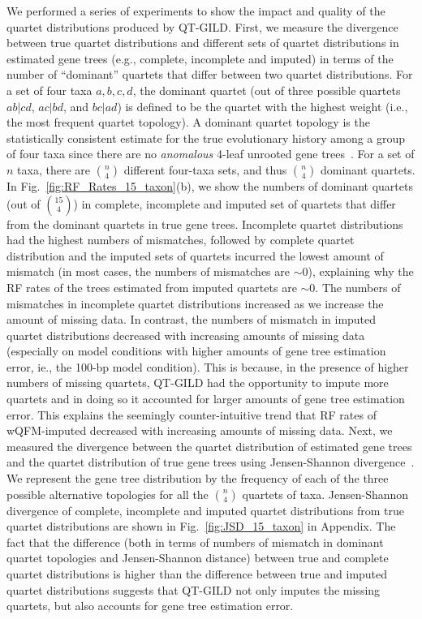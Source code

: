 We performed a series of experiments to show the impact and quality of the quartet distributions produced by QT-GILD. First, we measure the divergence between true quartet distributions and different sets of quartet distributions in estimated gene trees (e.g., complete, incomplete and imputed) in terms of the number of ``dominant'' quartets that differ between two quartet distributions.
For a set of four taxa $a, b, c, d$, the dominant quartet (out of three possible quartets $ab|cd$, $ac|bd$, and $bc|ad$) is defined to be the quartet with the highest weight (i.e., the most frequent quartet topology). A dominant quartet topology is the statistically consistent estimate for the true evolutionary history among a group of four taxa since there are no \textit{anomalous} 4-leaf unrooted gene trees~\cite{degnan-rosenberg,degnan2013anomalous}. For a set of $n$ taxa, there are $n\choose4$ different four-taxa sets, and thus $n\choose4$ dominant quartets. In Fig.~\ref{fig:RF_Rates_15_taxon}(b), we show the numbers of dominant quartets (out of $15\choose4$) in complete, incomplete and imputed set of quartets that differ from the dominant quartets in true gene trees. Incomplete quartet distributions had the highest numbers of mismatches, followed by complete quartet distribution and the imputed sets of quartets incurred the lowest amount of mismatch (in most cases, the numbers of mismatches are $\sim$0), explaining why the RF rates of the trees estimated from imputed quartets are $\sim$0. The numbers of mismatches in incomplete quartet distributions increased as we increase the amount of missing data. In contrast, the numbers of mismatch in imputed quartet distributions decreased with increasing amounts of missing data (especially on model conditions with higher amounts of gene tree estimation error, ie., the 100-bp model condition). This is because, in the presence of higher numbers of missing quartets, QT-GILD had the opportunity to impute more quartets and in doing so it accounted for larger amounts of gene tree estimation error. This explains the seemingly counter-intuitive trend that RF rates of wQFM-imputed decreased with increasing amounts of missing data. %
Next, we measured the divergence between the quartet distribution of estimated gene trees and the quartet distribution of true gene trees using Jensen-Shannon divergence~\cite{jensen-shannon}. We represent the gene tree distribution by the frequency of each of the three possible alternative topologies for all the $n \choose 4$ quartets of taxa. Jensen-Shannon divergence of complete, incomplete and imputed quartet distributions from true quartet distributions are shown in Fig.~\ref{fig:JSD_15_taxon} in Appendix. The fact that the difference (both in terms of numbers of mismatch in dominant quartet topologies and Jensen-Shannon distance) between true and complete quartet distributions is higher than the difference between true and imputed quartet distributions suggests that QT-GILD not only imputes the missing quartets, but also accounts for gene tree estimation error. %
